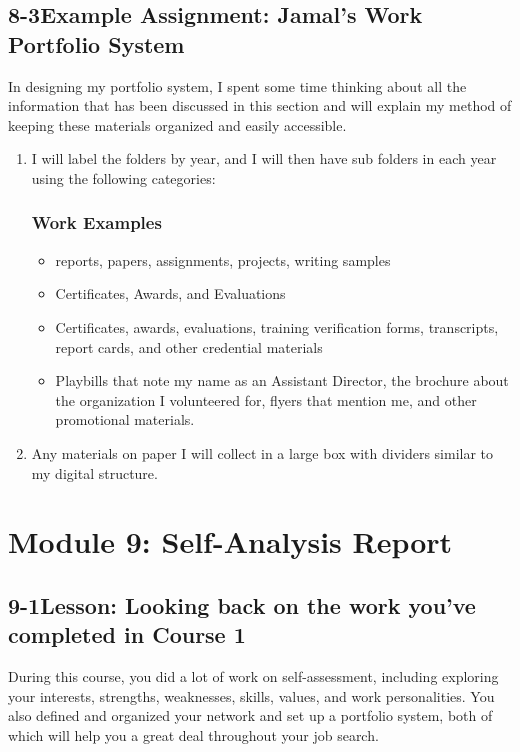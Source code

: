 \pagebreak \subsection*{8-3\quad Example Assignment: Jamal's Work Portfolio System}
In designing my portfolio system, I spent some time thinking about all the information that has been discussed in this section and will explain my method of keeping these materials organized and easily accessible.
\begin{enumerate}[leftmargin=1cm]
	\item  I will label the folders by year, and I will then have sub folders in each year using the following categories:

	      \subsubsection*{Work Examples}
	      \begin{itemize}
		      \item reports, papers, assignments, projects, writing samples
		      \item Certificates, Awards, and Evaluations
		      \item Certificates, awards, evaluations, training verification forms, transcripts, report cards, and other credential materials
		      \item Playbills that note my name as an Assistant Director, the brochure about the organization I volunteered for, flyers that mention me, and other promotional materials.
	      \end{itemize}
	\item Any materials on paper I will collect in a large box with dividers similar to my digital structure.
\end{enumerate}
\pagebreak \section*{Module 9:	Self-Analysis Report}
\noindent\makebox[\textwidth]{\rule{\linewidth}{0.4pt}} 
\localtableofcontents
\noindent\makebox[\textwidth]{\rule{\linewidth}{0.4pt}}


\pagebreak \subsection*{9-1\quad Lesson: Looking back on the work you've completed in Course 1}
During this course, you did a lot of work on self-assessment, including exploring your interests, strengths, weaknesses, skills, values, and work personalities. You also defined and organized your network and set up a portfolio system, both of which will help you a great deal throughout your job search.

